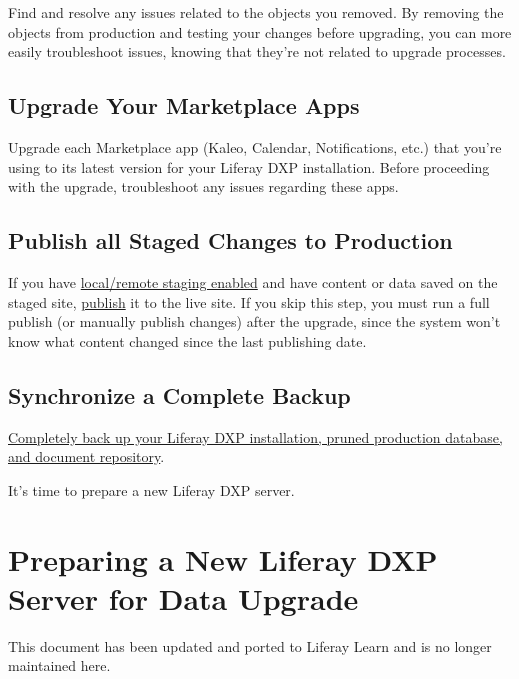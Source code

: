 Find and resolve any issues related to the objects you removed. By
removing the objects from production and testing your changes before
upgrading, you can more easily troubleshoot issues, knowing that they're
not related to upgrade processes.

\section{Upgrade Your Marketplace
Apps}\label{upgrade-your-marketplace-apps}

Upgrade each Marketplace app (Kaleo, Calendar, Notifications, etc.) that
you're using to its latest version for your Liferay DXP installation.
Before proceeding with the upgrade, troubleshoot any issues regarding
these apps.

\section{Publish all Staged Changes to
Production}\label{publish-all-staged-changes-to-production}

If you have
\href{/docs/7-2/user/-/knowledge_base/u/enabling-staging}{local/remote
staging enabled} and have content or data saved on the staged site,
\href{/docs/7-2/user/-/knowledge_base/u/publishing-staged-content-efficiently}{publish}
it to the live site. If you skip this step, you must run a full publish
(or manually publish changes) after the upgrade, since the system won't
know what content changed since the last publishing date.

\section{Synchronize a Complete
Backup}\label{synchronize-a-complete-backup}

\href{/docs/7-2/deploy/-/knowledge_base/d/backing-up-a-liferay-installation}{Completely
back up your Liferay DXP installation, pruned production database, and
document repository}.

It's time to prepare a new Liferay DXP server.

\chapter{Preparing a New Liferay DXP Server for Data
Upgrade}\label{preparing-a-new-liferay-dxp-server-for-data-upgrade}

{This document has been updated and ported to Liferay Learn and is no
longer maintained here.}

